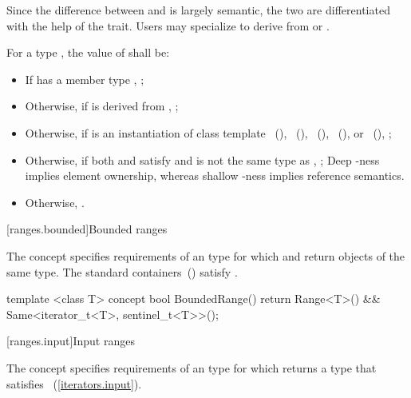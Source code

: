 \begin{itemdescr}
\pnum
Since the difference between  and  is largely semantic, the
two are differentiated with the help of the 
trait. Users may specialize 
to derive from  or .

\pnum
For a type , the value of  shall be:
\begin{itemize}
\item If  has a member type , ;
\item Otherwise, if  is derived from , ;
\item Otherwise, if  is an instantiation of class template
~(),
~(),
~(),
~(), or
~(), ;
\item Otherwise, if both  and  satisfy  and 
 is not the same type as 
,
; \enternote Deep -ness implies element ownership, whereas shallow -ness
implies reference semantics. \exitnote
\item Otherwise, .
\end{itemize}
\end{itemdescr}

[ranges.bounded]{Bounded ranges}

\pnum
The  concept specifies requirements
of an  type for which  and  return objects of
the same type. \enternote The standard containers~()
satisfy .\exitnote

\begin{codeblock}
template <class T>
concept bool BoundedRange() {
  return Range<T>() && Same<iterator_t<T>, sentinel_t<T>>();
}
\end{codeblock}

[ranges.input]{Input ranges}

\pnum
The  concept specifies requirements of
an  type for which  returns a type
that satisfies ~(\ref{iterators.input}).

